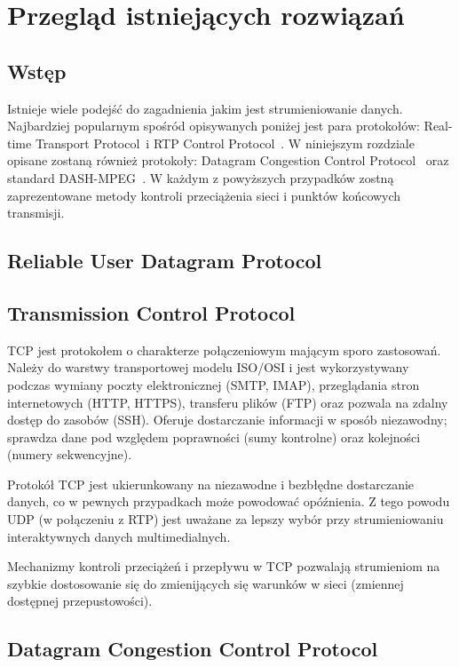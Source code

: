 \chapter{Przegląd istniejących rozwiązań}
\label{cha:rozdzial3}

\section{Wstęp}

Istnieje wiele podejść do zagadnienia jakim jest strumieniowanie danych. Najbardziej popularnym spośród opisywanych poniżej jest para protokołów: Real-time Transport Protocol~i RTP Control Protocol~\cite{RFC3550}. W niniejszym rozdziale opisane zostaną również protokoły: Datagram Congestion Control Protocol~\cite{RFC4340} oraz standard DASH-MPEG~\cite{ISO-IEC-DASH}. W każdym z powyższych przypadków zostną zaprezentowane metody kontroli przeciążenia sieci i punktów końcowych transmisji.

\section{Reliable User Datagram Protocol}

\section{Transmission Control Protocol}

TCP jest protokołem o charakterze połączeniowym mającym sporo zastosowań. Należy do warstwy transportowej modelu ISO/OSI i jest wykorzystywany podczas wymiany poczty elektronicznej (SMTP, IMAP), przeglądania stron internetowych (HTTP, HTTPS), transferu plików (FTP) oraz pozwala na zdalny dostęp do zasobów (SSH). Oferuje dostarczanie informacji w sposób niezawodny; sprawdza dane pod względem poprawności (sumy kontrolne) oraz kolejności (numery sekwencyjne).

Protokół TCP jest ukierunkowany na niezawodne i bezbłędne dostarczanie danych, co w pewnych przypadkach może powodować opóźnienia. Z tego powodu UDP (w połączeniu z RTP) jest uważane za lepszy wybór przy strumieniowaniu interaktywnych danych multimedialnych. 

Mechanizmy kontroli przeciążeń i przepływu w TCP pozwalają strumieniom na szybkie dostosowanie się do zmienijących się warunków w sieci (zmiennej dostępnej przepustowości).

\section{Datagram Congestion Control Protocol}

